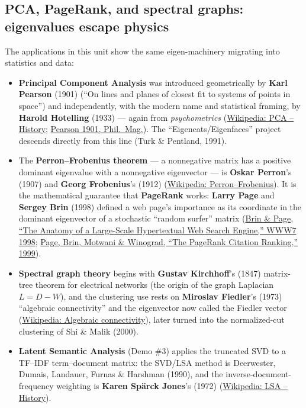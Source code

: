 \documentclass[11pt]{article}
\newcommand{\who}[1]{{\sffamily\bfseries #1}}
\newcommand{\yr}[1]{{\sffamily\color{BrickRed}(#1)}}
\begin{document}
\subsection{PCA, PageRank, and spectral graphs: eigenvalues escape physics}
The applications in this unit show the same eigen-machinery migrating into
statistics and data:
\begin{itemize}[leftmargin=1.4em,itemsep=2pt]
  \item \who{Principal Component Analysis} was introduced geometrically by
        \who{Karl Pearson} \yr{1901} (``On lines and planes of closest fit to
        systems of points in space'') and independently, with the modern name and
        statistical framing, by \who{Harold Hotelling} \yr{1933} --- again from
        \emph{psychometrics}
        (\href{https://en.wikipedia.org/wiki/Principal_component_analysis\#History}{Wikipedia:
        PCA -- History}; \href{https://www.tandfonline.com/doi/abs/10.1080/14786440109462720}{Pearson
        1901, Phil.\ Mag.}). The ``Eigencats/Eigenfaces'' project descends directly
        from this line (Turk \& Pentland, 1991).
  \item The \who{Perron--Frobenius theorem} --- a nonnegative matrix has a positive
        dominant eigenvalue with a nonnegative eigenvector --- is \who{Oskar
        Perron}'s \yr{1907} and \who{Georg Frobenius}'s \yr{1912}
        (\href{https://en.wikipedia.org/wiki/Perron\%E2\%80\%93Frobenius_theorem}{Wikipedia:
        Perron--Frobenius}). It is the mathematical guarantee that
        \who{PageRank} works: \who{Larry Page} and \who{Sergey Brin} \yr{1998}
        defined a web page's importance as its coordinate in the dominant
        eigenvector of a stochastic ``random surfer'' matrix
        (\href{http://infolab.stanford.edu/~backrub/google.html}{Brin \& Page, ``The
        Anatomy of a Large-Scale Hypertextual Web Search Engine,'' WWW7 1998};
        \href{http://ilpubs.stanford.edu:8090/422/}{Page, Brin, Motwani \&
        Winograd, ``The PageRank Citation Ranking,'' 1999}).
  \item \who{Spectral graph theory} begins with \who{Gustav Kirchhoff}'s \yr{1847}
        matrix-tree theorem for electrical networks (the origin of the graph
        Laplacian $L=D-W$), and the clustering use rests on \who{Miroslav
        Fiedler}'s \yr{1973} ``algebraic connectivity'' and the eigenvector now
        called the Fiedler vector
        (\href{https://en.wikipedia.org/wiki/Algebraic_connectivity}{Wikipedia:
        Algebraic connectivity}), later turned into the normalized-cut clustering
        of Shi \& Malik \yr{2000}.
  \item \who{Latent Semantic Analysis} (Demo \#3) applies the truncated SVD to a
        TF--IDF term--document matrix: the SVD/LSA method is Deerwester, Dumais,
        Landauer, Furnas \& Harshman \yr{1990}, and the inverse-document-frequency
        weighting is \who{Karen Sp\"arck Jones}'s \yr{1972}
        (\href{https://en.wikipedia.org/wiki/Latent_semantic_analysis\#History}{Wikipedia:
        LSA -- History}).
\end{itemize}
\end{document}
